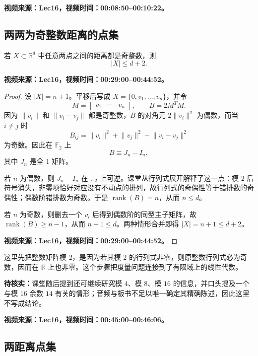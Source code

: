 \ifdefined\VideoNotesTestMode
\textbf{视频来源：Lec16，视频时间：00:08:50--00:10:22。}
\fi

\subsection{两两为奇整数距离的点集}

\begin{theorem}
若 $X\subset\mathbb{R}^d$ 中任意两点之间的距离都是奇整数，则
\[
|X|\leq d+2.
\]

\ifdefined\VideoNotesTestMode
\textbf{视频来源：Lec16，视频时间：00:29:00--00:44:52。}
\fi
\end{theorem}

\begin{proof}
设 $|X|=n+1$。平移后写成 $X=\{0,v_1,\dots,v_n\}$，并令
\[
M=\begin{bmatrix}v_1&\cdots&v_n\end{bmatrix},
\qquad B=2M^TM.
\]
因为 $\lVert v_i\rVert$ 和 $\lVert v_i-v_j\rVert$ 都是奇整数，$B$ 的对角元
$2\lVert v_i\rVert^2$ 为偶数，而当 $i\ne j$ 时
\[
B_{ij}=\lVert v_i\rVert^2+\lVert v_j\rVert^2-
\lVert v_i-v_j\rVert^2
\]
为奇数。因此在 $\mathbb{F}_2$ 上
\[
B\equiv J_n-I_n,
\]
其中 $J_n$ 是全 $1$ 矩阵。

若 $n$ 为偶数，则 $J_n-I_n$ 在 $\mathbb{F}_2$ 上可逆。课堂从行列式展开解释了这一点：模 $2$ 后符号消失，非零项恰好对应没有不动点的排列，故行列式的奇偶性等于错排数的奇偶性；偶数阶错排数为奇数。于是 $\operatorname{rank}(B)=n$，从而 $n\leq d$。

若 $n$ 为奇数，则删去一个 $v_i$ 后得到偶数阶的同型主子矩阵，故 $\operatorname{rank}(B)\geq n-1$，从而 $n-1\leq d$。两种情形合并即得 $|X|=n+1\leq d+2$。

\ifdefined\VideoNotesTestMode
\textbf{视频来源：Lec16，视频时间：00:29:00--00:44:52。}
\fi
\end{proof}

这里先把整数矩阵模 $2$，是因为若其模 $2$ 的行列式非零，则原整数行列式必为奇数，因而在 $\mathbb{R}$ 上也非零。这个步骤把度量问题连接到了有限域上的线性代数。

\textbf{待核实：}课堂随后提到还可继续研究模 $4$、模 $8$、模 $16$ 的信息，并口头提及一个与模 $16$ 余数 $14$ 有关的情形；音频与板书不足以唯一确定其精确陈述，因此这里不写成结论。

\ifdefined\VideoNotesTestMode
\textbf{视频来源：Lec16，视频时间：00:45:00--00:46:06。}
\fi

\subsection{两距离点集}

